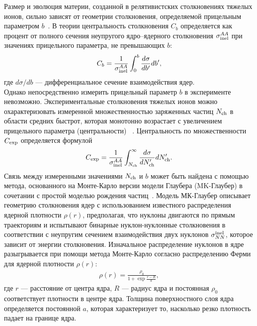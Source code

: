 Размер и эволюция материи, созданной в релятивистских столкновениях тяжелых ионов, сильно зависят от геометрии столкновения, определяемой прицельным параметром $b$~\cite{ALICE:2010mlf,ALICE:2015juo}. 
В теории центральность столкновения $C_b$ определяется как процент от полного сечения неупругого ядро--ядерного
столкновения $\sigma_{\rm inel}^{AA}$ при значениях прицельного параметра, не превышающих $b$:
%
\begin{equation}
    C_b = \frac{1}{\sigma_{\rm inel}^{AA}} \int_{0}^{b} \frac{d\sigma}{db'}db',
\end{equation}
%
где $d\sigma/db$ --- дифференциальное сечение взаимодействия ядер.\\
Однако непосредственно измерить прицельный параметр $b$ в эксперименте невозможно. Экспериментальные столкновения тяжелых ионов можно 
охарактеризовать измеренной множественностью заряженных частиц $N_{\rm ch}$ в области средних быстрот, которая монотонно 
возрастает с увеличением прицельного параметра (центральности) ~\cite{Miller:2007ri,Segal:2020ftt,HADES:2017def,nicacent2}.
Центральность по множественности $C_{\rm exp}$ определяется формулой
%
\begin{equation}
    C_{\rm exp} = \frac{1}{\sigma_{\rm inel}^{AA}} \int_{N_{\rm ch}}^{\infty} \frac{d\sigma}{dN_{\rm ch}'}dN_{\rm ch}'.
\end{equation}
%
Связь между измеренными значениями $N_{\rm ch}$ и $b$ может быть найдена с помощью метода, основанного на Монте-Карло версии модели Глаубера (MK-Глаубер) в сочетании с простой моделью рождения частиц~\cite{Miller:2007ri,nicacent2}.
Модель МК-Глаубер описывает геометрию столкновения ядер с использованием известного распределения ядерной плотности $\rho(r)$, предполагая, что нуклоны двигаются по прямым траекториям и испытывают бинарные нуклон-нуклонные столкновения в соответствии с неупругим сечением взаимодействия двух нуклонов $\sigma_{NN}^{\rm inel}$, которое зависит от энергии столкновения. 
Изначальное распределение нуклонов в ядре разыгрывается при помощи метода Монте-Карло согласно распределению Ферми для ядерной плотности $\rho(r)$: 
%
\begin{eqnarray}
	\label{eq:McGlauberFermi}
	\rho(r) =  \frac{\rho_0}{1+\exp{\frac{r-R}{a}}},
\end{eqnarray}
%
где $r$ --- расстояние от центра ядра, $R$ --- радиус ядра и постоянная $\rho_0$ соответствует плотности в центре ядра.
Толщина поверхностного слоя ядра определяется постоянной $a$, которая характеризует то, насколько резко плотность падает на границе ядра. 
